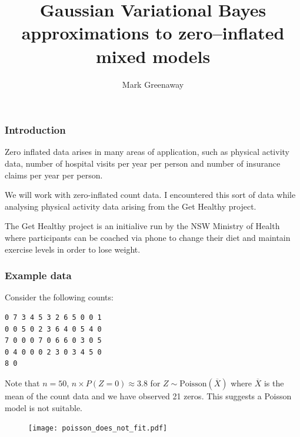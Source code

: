 \documentclass{beamer}
\title{Gaussian Variational Bayes approximations to zero--inflated mixed models}
\author{Mark Greenaway}
\begin{document}
\begin{frame}
	\titlepage
\end{frame}

\begin{frame}
	\frametitle{Introduction}
	
	Zero inflated data arises in many areas of application, such as physical activity data, number of hospital
	visits per year per person and number of insurance claims per year per person.
					
	\bigskip 
	
	We will work with zero-inflated count data. I encountered this sort of data  while analysing physical
	activity data arising from the Get Healthy project.
		
	The Get Healthy project is an initialive run by the NSW Ministry of Health where participants can be coached
	via phone to change their diet and maintain exercise levels in order to lose weight.
	
\end{frame}

\begin{frame}[fragile]
	\frametitle{Example data}
	Consider the following counts:
	\begin{verbatim}
0 7 3 4 5 3 2 6 5 0 0 1
0 0 5 0 2 3 6 4 0 5 4 0
7 0 0 0 7 0 6 6 0 3 0 5
0 4 0 0 0 2 3 0 3 4 5 0
8 0
	\end{verbatim}
					
	\noindent Note that $n=50$, 
	$n\times P(Z = 0) \approx 3.8$ for $Z\sim\mbox{Poisson}(\overline{X})$
	where $\overline{X}$ is the mean of the count data and we have observed 21 zeros. This suggests
	a Poisson model is not suitable.
					
	\begin{figure}
		\texttt{[image: poisson\_does\_not\_fit.pdf]}
	\end{figure}%
\end{frame}
\end{document}
